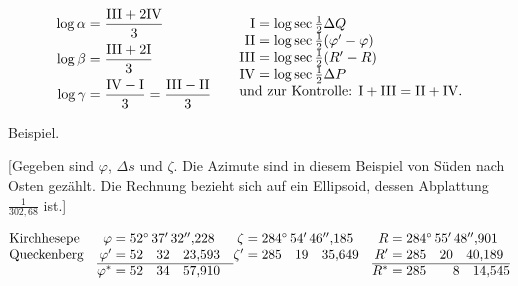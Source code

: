 \par\clearpage
\noindent{}\makebox[12mm][r]{}\par\medskip

\[
\begin{array}{@{}l@{\qquad}l@{}}
\begin{aligned}[t]
\log\alpha&=\frac{\mathrm{III}+2\mathrm{IV}}3\\[.4ex]
\log\beta&=\frac{\mathrm{III}+2\mathrm I}3\\[.4ex]
\log\gamma&=\frac{\mathrm{IV}-\mathrm I}3=\frac{\mathrm{III}-\mathrm{II}}3
\end{aligned}
&
\begin{array}[t]{@{}r@{\;}l@{}}
\mathrm{I}&=\log\sec\tfrac12\Delta Q\\
\mathrm{II}&=\log\sec\tfrac12(\varphi'-\varphi)\\
\mathrm{III}&=\log\sec\tfrac12(R'-R)\\
\mathrm{IV}&=\log\sec\tfrac12\Delta P\\
\multicolumn{2}{@{}l@{}}{\text{und zur Kontrolle: }\mathrm I+\mathrm{III}=\mathrm{II}+\mathrm{IV}.}
\end{array}
\end{array}
\]

\begin{center}Beispiel.\end{center}
[Gegeben sind \(\varphi\), \(\Delta s\) und \(\zeta\). Die Azimute sind in diesem Beispiel
von Süden nach Osten gezählt. Die Rechnung bezieht sich auf ein Ellipsoid, dessen
Abplattung \(\frac1{302{,}68}\) ist.]

\[
\begin{array}{@{}l@{\quad}r@{\;}l@{\quad}r@{\;}l@{\quad}r@{\;}l@{}}
\text{Kirchhesepe}&\varphi=&52^\circ\,37'\,32''{,}228&
\zeta=&284^\circ\,54'\,46''{,}185&R=&284^\circ\,55'\,48''{,}901\\
\text{Queckenberg}&\varphi'=&52\quad32\quad23{,}593&
\zeta'=&285\quad19\quad35{,}649&R'=&285\quad20\quad40{,}189\\
\cline{2-3}\cline{6-7}
&\varphi^*=&52\quad34\quad57{,}910&&&R^*=&285\qquad8\quad14{,}545
\end{array}
\]


